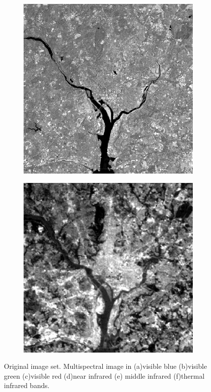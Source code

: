 \begin{figure}[h!]
\begin{subfigure}[b]{0.3\linewidth}
		\caption{}
		\label{fig:band4}
	\end{subfigure}
	\begin{subfigure}[b]{0.3\linewidth}
		\includegraphics[width=\linewidth]{myfigure/p10/WashingtonDC_Band5.png}
		\caption{}
		\label{fig:band5}
	\end{subfigure}
	\begin{subfigure}[b]{0.3\linewidth}
		\includegraphics[width=\linewidth]{myfigure/p10/WashingtonDC_Band6.png}
		\caption{}
		\label{fig:band6}
	\end{subfigure}
	
	\caption{Original image set. Multispectral image in (a)visible blue (b)visible green (c)visible red (d)near infrared (e) middle infrared (f)thermal infrared bands.}
	\label{fig:washington}
\end{figure}

